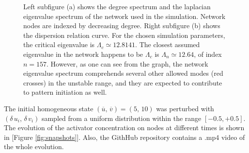 \begin{figure}[H]
\centering
{}
\hfill
{}
\caption{Left subfigure (a) shows the degree spectrum and the laplacian eigenvalue spectrum of the network used in the simulation. Network nodes are indexed by decreasing degree. Right subfigure (b) shows the dispersion relation curve. For the chosen simulation parameters, the critical eigenvalue is $\Lambda_c \simeq 12.8141$. The closest assumed eigenvalue in the network happens to be $\Lambda_c$ is $\Lambda_n \simeq 12.64$, of index $n=157$. However, as one can see from the graph, the network eigenvalue spectrum comprehends several other allowed modes (red crosses) in the unstable range, and they are expected to contribute to pattern initiation as well.}
\end{figure}
\noindent
The initial homogeneous state $(\overline{u},\,\overline{v})=(5,\,10)$ was perturbed with $(\delta\,u_i,\,\delta\,v_i)$ sampled from a uniform distribution within the range $[-0.5, + 0.5]$. The evolution of the activator concentration on nodes at different times is shown in [Figure \ref{fig:snapshots}]. Also, the GithHub repository \cite{git} contains a .mp4 video of the whole evolution. 
